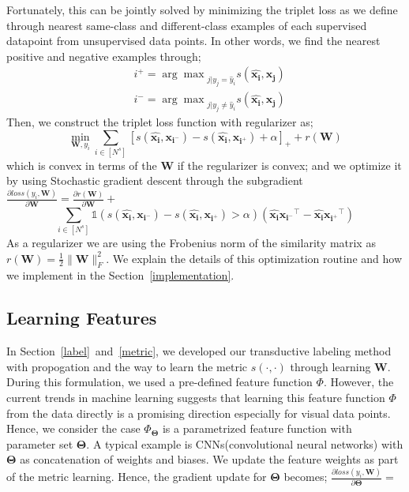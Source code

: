 Fortunately, this can be jointly solved by minimizing the triplet loss as we define through nearest same-class and different-class examples of each supervised datapoint from unsupervised data points. In other words, we find the nearest positive and negative examples through;
\begin{equation}
\begin{aligned}
&i^{+} = {\arg\max}_{j | y_j = \hat{y}_i} s(\mathbf{\hat{x_i}},\mathbf{x_{j}}) \\
&i^{-} = {\arg\max}_{j | y_j \neq \hat{y}_i} s(\mathbf{\hat{x_i}},\mathbf{x_{j}}) 
\label{sup_nn}
\end{aligned}
\end{equation}
Then, we construct the triplet loss function with regularizer as;
\begin{equation}
\min_{\mathbf{W}, y_i} \sum_{i \in [N^s]} [s(\mathbf{\hat{x_i}},\mathbf{x_{i^-}}) - s(\mathbf{\hat{x_i}},\mathbf{x_{i^+}}) + \alpha]_{+} + r(\mathbf{W})
\end{equation}
which is convex in terms of the $\mathbf{W}$ if the regularizer is convex; and we optimize it by using Stochastic gradient descent through the subgradient $\frac{\partial loss (y_i, \mathbf{W})}{\partial \mathbf{W}} = \frac{\partial r ( \mathbf{W})}{\partial \mathbf{W}} + $
\begin{equation}
\sum_{i \in [N^s]} \mathds{1}(s(\mathbf{\hat{x_i}},\mathbf{x_{i^-}}) - s(\mathbf{\hat{x_i}},\mathbf{x_{i^+}})>\alpha) \left( \mathbf{\hat{x_i}}\mathbf{x_{i^-}}^\intercal - \mathbf{\hat{x_i}}\mathbf{x_{i^+}}^\intercal  \right)  
\label{gradw}
\end{equation}
As a regularizer we are using the Frobenius norm of the similarity matrix as $r(\mathbf{W})=\frac{1}{2}\|\mathbf{W}\|_F^2$. We explain the details of this optimization routine and how we implement in the Section~\ref{implementation}.
\subsection{Learning Features}
In Section~\ref{label}~and~\ref{metric}, we developed our transductive labeling method with propogation and the way to learn the metric $s(\cdot,\cdot)$ through learning $\mathbf{W}$. During this formulation, we used a pre-defined feature function $\Phi$. However, the current trends in machine learning suggests that learning this feature function $\Phi$ from the data directly is a promising direction especially for visual data points. Hence, we consider the case $\Phi_{\mathbf{\Theta}}$ is a parametrized feature function with parameter set $\mathbf{\Theta}$. A typical example is CNNs(convolutional neural networks) with $\mathbf{\Theta}$ as concatenation of weights and biases. We update the feature weights as part of the metric learning. Hence, the gradient update for $\mathbf{\Theta}$ becomes; $\frac{\partial loss (y_i, \mathbf{W})}{\partial \mathbf{\Theta}} =$


